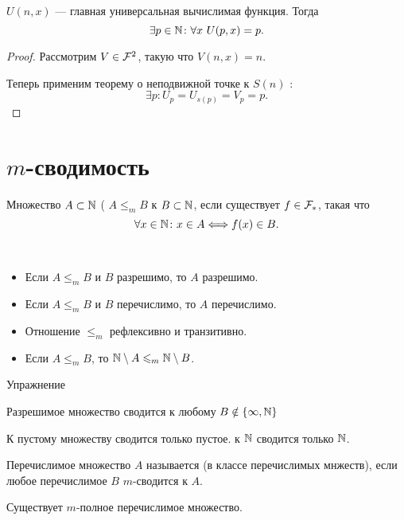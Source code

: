 \begin{cor}
	$ U(n, x)$ --- главная универсальная вычислимая функция. Тогда 
	\[
		\exists p \in \mathbb{N} \colon \forall x  ~ U(p, x) = p
	.\] 
\end{cor}
\begin{proof}
	Рассмотрим $ V \in \mathcal{F}^{2}$, такую что $ V(n, x) = n$.

	Теперь применим теорему о неподвижной точке к  $ S(n)$ : 
	\[
		\exists p \colon  U_p = U_{s(p)} = V_p = p
	.\] 
\end{proof}

\section{$ m$-сводимость}
\begin{defn}[$ m$-сводимость]
	Множество $ A \subset \mathbb{N}$   ( $ A \le_{m} B$ к $ B \subset \mathbb{N}$, если существует $ f \in \mathcal{F}_{*}$, такая что
	\[
		\forall x \in \mathbb{N} \colon x \in A \Longleftrightarrow f(x) \in B
	.\] 
\end{defn}
\begin{prop}
	~\begin{itemize}
		\item Если $ A \le _{m} B$ и $ B$ разрешимо, то $ A$ разрешимо.
		\item Если $ A \le _{m} B$ и $ B$ перечислимо, то $ A$ перечислимо.
		\item Отношение $ \le _{m}$ рефлексивно и транзитивно.
		\item Если $ A \le _{m} B$, то $ \mathbb{N} \setminus A \leqslant _{m} \mathbb{N} \setminus B$.
	\end{itemize}
\end{prop}
\begin{proof*}
    Упражнение
\end{proof*}
\begin{note}
    Разрешимое множество сводится к любому $ B \notin \{\infty, \mathbb{N}\}$
\end{note}
\begin{note}
    К пустому множеству сводится только пустое. к $ \mathbb{N}$ сводится только $ \mathbb{N}$.
\end{note}


\begin{defn}[$ m$-полнота]
	Перечислимое множество $ A$ называется  (в классе перечислимых мнжеств), если любое перечислимое $ B$  $ m$-сводится к $ A$.
\end{defn}

\begin{thm}
    Существует $ m$-полное перечислимое множество.
\end{thm}
